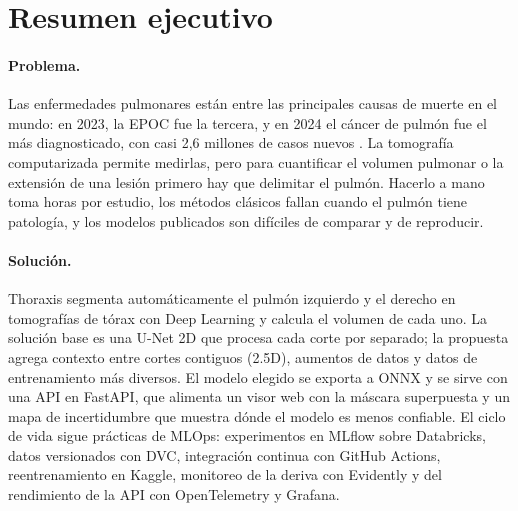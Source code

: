 %

\section*{Resumen ejecutivo}
\label{summary:start}

\paragraph{Problema.}
Las enfermedades pulmonares están entre las principales causas de muerte en el
mundo: en 2023, la EPOC fue la tercera, y en 2024 el cáncer de pulmón fue el
más diagnosticado, con casi 2,6 millones de casos nuevos
\parencite{oms2026, sung2026}. La tomografía computarizada permite medirlas,
pero para cuantificar el volumen pulmonar o la extensión de una lesión primero
hay que delimitar el pulmón. Hacerlo a mano toma horas por estudio, los métodos
clásicos fallan cuando el pulmón tiene patología, y los modelos publicados son
difíciles de comparar y de reproducir.

\paragraph{Solución.}
Thoraxis segmenta automáticamente el pulmón izquierdo y el derecho en
tomografías de tórax con Deep Learning y calcula el volumen de cada uno. La
solución base es una U-Net 2D que procesa cada corte por separado; la propuesta
agrega contexto entre cortes contiguos (2.5D), aumentos de datos y datos de
entrenamiento más diversos. El modelo elegido se exporta a ONNX y se sirve con
una API en FastAPI, que alimenta un visor web con la máscara superpuesta y un
mapa de incertidumbre que muestra dónde el modelo es menos confiable. El
ciclo de vida sigue prácticas de MLOps: experimentos en MLflow sobre
Databricks, datos versionados con DVC, integración continua con GitHub Actions,
reentrenamiento en Kaggle, monitoreo de la deriva con Evidently y del
rendimiento de la API con OpenTelemetry y Grafana.

